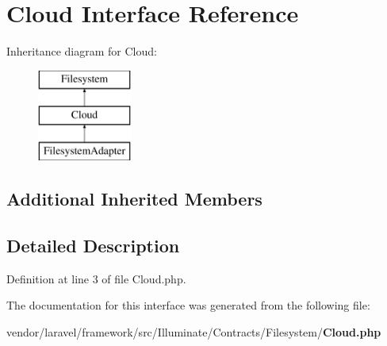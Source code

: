 \section{Cloud Interface Reference}
\label{interface_illuminate_1_1_contracts_1_1_filesystem_1_1_cloud}
Inheritance diagram for Cloud\+:\begin{figure}[H]
\begin{center}
\leavevmode
\includegraphics[height=3.000000cm]{interface_illuminate_1_1_contracts_1_1_filesystem_1_1_cloud}
\end{center}
\end{figure}
\subsection*{Additional Inherited Members}


\subsection{Detailed Description}


Definition at line 3 of file Cloud.\+php.



The documentation for this interface was generated from the following file\+:\begin{DoxyCompactItemize}
\item 
vendor/laravel/framework/src/\+Illuminate/\+Contracts/\+Filesystem/{\bf Cloud.\+php}\end{DoxyCompactItemize}
